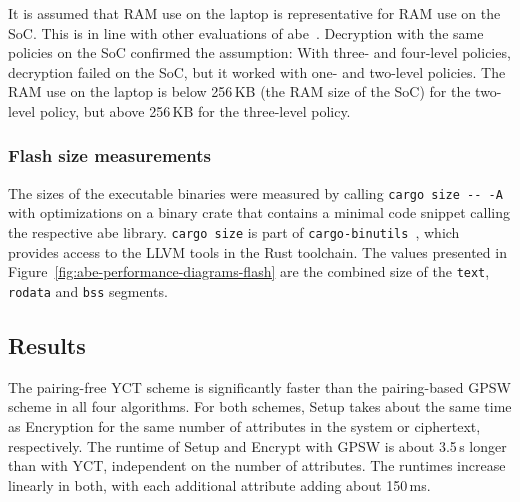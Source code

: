 It is assumed that RAM use on the laptop is representative for RAM use on the SoC.
This is in line with other evaluations of \acrshort{abe}~\cite{borgh_attribute-based_2016}. 
Decryption with the same policies on the SoC confirmed the assumption:
With three- and four-level policies, decryption failed on the SoC, but it worked with one- and two-level policies.
The RAM use on the laptop is below 256\,KB (the RAM size of the SoC) for the two-level policy, but above 256\,KB for the three-level policy.

\subsubsection{Flash size measurements}


The sizes of the executable binaries were measured by calling \verb+cargo size -- -A+ with optimizations on a binary crate that contains a minimal code snippet calling the respective \acrshort{abe} library.
\verb+cargo size+ is part of \verb+cargo-binutils+~\cite{noauthor_cargo-binutils_nodate}, which provides access to the LLVM tools in the Rust toolchain.
The values presented in Figure~\ref{fig:abe-performance-diagrams-flash} are the combined size of the \texttt{text}, \texttt{rodata} and \texttt{bss} segments.


\subsection{Results} %
The pairing-free YCT scheme is significantly faster than the pairing-based GPSW scheme in all four algorithms. 
For both schemes, Setup takes about the same time as Encryption for the same number of attributes in the system or ciphertext, respectively.
The runtime of Setup and Encrypt with GPSW is about 3.5\,s longer than with YCT, independent on the number of attributes.
The runtimes increase linearly in both, with each additional attribute adding about 150\,ms.

